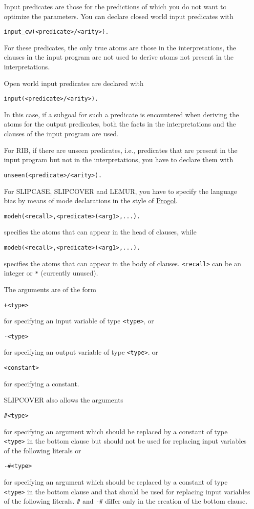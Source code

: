 \documentclass[a4paper,10pt]{scrartcl}
\begin{document}
Input predicates are those for the predictions of which you do not want to optimize the parameters. You can declare closed world input predicates with
\begin{verbatim}
input_cw(<predicate>/<arity>).
\end{verbatim}
For these predicates, the only true atoms are those in the interpretations, the clauses in the input program are not used to derive atoms not present in the interpretations.

Open world input predicates are declared with
\begin{verbatim}
input(<predicate>/<arity>).
\end{verbatim}
In this case, if a subgoal for such a predicate is encountered when deriving the atoms for the output predicates, 
both the facts in the interpretations and the clauses of the input program are used.

For RIB, if there are unseen predicates, i.e., predicates that are present in the input program but not in the interpretations, you have to declare them with
\begin{verbatim}
unseen(<predicate>/<arity>).
\end{verbatim}

For SLIPCASE, SLIPCOVER and LEMUR, you have to specify the language bias by means of mode declarations in the style of 
\href{http://www.doc.ic.ac.uk/\string ~shm/progol.html}{Progol}.
\begin{verbatim}
modeh(<recall>,<predicate>(<arg1>,...).
\end{verbatim}
specifies the atoms that can appear in the head of clauses, while
\begin{verbatim}
modeb(<recall>,<predicate>(<arg1>,...).
\end{verbatim}
specifies the atoms that can appear in the body of clauses.
\texttt{<recall>} can be an integer or \texttt{*} (currently unused).

The arguments are of the form
\begin{verbatim}
+<type>
\end{verbatim}
for specifying an input variable of type \texttt{<type>}, or 
\begin{verbatim}
-<type>
\end{verbatim}
for specifying an output variable of type \texttt{<type>}. or
\begin{verbatim}
<constant>
\end{verbatim}
for specifying a constant.

SLIPCOVER also allows the arguments
\begin{verbatim}
#<type>
\end{verbatim}
for specifying an argument which should be replaced by a constant of type \texttt{<type>} in the bottom clause but should not be used for replacing input variables of the following literals or 
\begin{verbatim}
-#<type>
\end{verbatim}
for specifying an argument which should be replaced by a constant of type \texttt{<type>} in the bottom clause and that should be used for replacing input variables of the following literals. \verb|#| and \verb|-#| differ only in the creation of the bottom clause.
\end{document}
